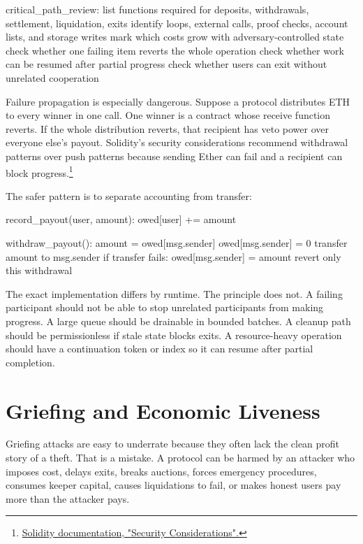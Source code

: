 \begin{codeblock}
critical_path_review:
    list functions required for deposits, withdrawals, settlement, liquidation, exits
    identify loops, external calls, proof checks, account lists, and storage writes
    mark which costs grow with adversary-controlled state
    check whether one failing item reverts the whole operation
    check whether work can be resumed after partial progress
    check whether users can exit without unrelated cooperation
\end{codeblock}

Failure propagation is especially dangerous. Suppose a protocol distributes ETH to every winner in one call. One winner is a contract whose receive function reverts. If the whole distribution reverts, that recipient has veto power over everyone else's payout. Solidity's security considerations recommend withdrawal patterns over push patterns because sending Ether can fail and a recipient can block progress.\footnote{\href{https://docs.soliditylang.org/en/latest/security-considerations.html}{Solidity documentation, "Security Considerations".}}

The safer pattern is to separate accounting from transfer:

\begin{codeblock}
record_payout(user, amount):
    owed[user] += amount

withdraw_payout():
    amount = owed[msg.sender]
    owed[msg.sender] = 0
    transfer amount to msg.sender
    if transfer fails:
        owed[msg.sender] = amount
        revert only this withdrawal
\end{codeblock}

The exact implementation differs by runtime. The principle does not. A failing participant should not be able to stop unrelated participants from making progress. A large queue should be drainable in bounded batches. A cleanup path should be permissionless if stale state blocks exits. A resource-heavy operation should have a continuation token or index so it can resume after partial completion.

\section{Griefing and Economic Liveness}

Griefing attacks are easy to underrate because they often lack the clean profit story of a theft. That is a mistake. A protocol can be harmed by an attacker who imposes cost, delays exits, breaks auctions, forces emergency procedures, consumes keeper capital, causes liquidations to fail, or makes honest users pay more than the attacker pays.

